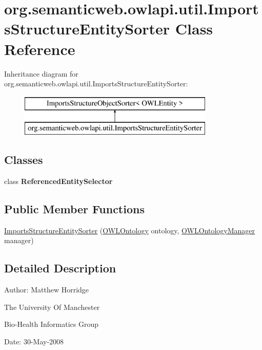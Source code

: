 \hypertarget{classorg_1_1semanticweb_1_1owlapi_1_1util_1_1_imports_structure_entity_sorter}{\section{org.\-semanticweb.\-owlapi.\-util.\-Imports\-Structure\-Entity\-Sorter Class Reference}
\label{classorg_1_1semanticweb_1_1owlapi_1_1util_1_1_imports_structure_entity_sorter}
}
Inheritance diagram for org.\-semanticweb.\-owlapi.\-util.\-Imports\-Structure\-Entity\-Sorter\-:\begin{figure}[H]
\begin{center}
\leavevmode
\includegraphics[height=2.000000cm]{classorg_1_1semanticweb_1_1owlapi_1_1util_1_1_imports_structure_entity_sorter}
\end{center}
\end{figure}
\subsection*{Classes}
\begin{DoxyCompactItemize}
\item 
class {\bfseries Referenced\-Entity\-Selector}
\end{DoxyCompactItemize}
\subsection*{Public Member Functions}
\begin{DoxyCompactItemize}
\item 
\hyperlink{classorg_1_1semanticweb_1_1owlapi_1_1util_1_1_imports_structure_entity_sorter_ae44543d9791fc7b79d767811060fa7a7}{Imports\-Structure\-Entity\-Sorter} (\hyperlink{interfaceorg_1_1semanticweb_1_1owlapi_1_1model_1_1_o_w_l_ontology}{O\-W\-L\-Ontology} ontology, \hyperlink{interfaceorg_1_1semanticweb_1_1owlapi_1_1model_1_1_o_w_l_ontology_manager}{O\-W\-L\-Ontology\-Manager} manager)
\end{DoxyCompactItemize}


\subsection{Detailed Description}
Author\-: Matthew Horridge\par
 The University Of Manchester\par
 Bio-\/\-Health Informatics Group\par
 Date\-: 30-\/\-May-\/2008\par
\par
 

